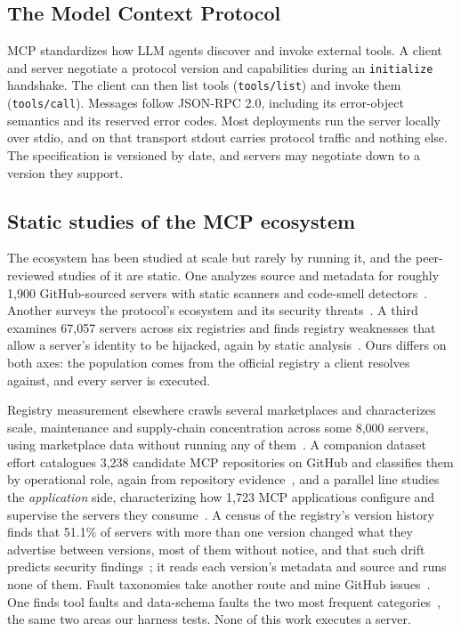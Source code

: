 \subsection{The Model Context Protocol}
MCP standardizes how LLM agents discover and invoke external tools. A client and
server negotiate a protocol version and capabilities during an \texttt{initialize}
handshake. The client can then list tools (\texttt{tools/list}) and invoke them
(\texttt{tools/call}). Messages follow JSON-RPC 2.0, including its error-object
semantics and its reserved error codes. Most deployments run the server locally over
stdio, and on that transport stdout carries protocol traffic and nothing else. The
specification is versioned by date, and servers may negotiate down to a version they
support.

\subsection{Static studies of the MCP ecosystem}
The ecosystem has been studied at scale but rarely by running it, and the
peer-reviewed studies of it are static. One analyzes source and metadata for roughly
1,900 GitHub-sourced servers with static scanners and code-smell
detectors~\cite{mcpfirstglance}. Another surveys the protocol's ecosystem and its
security threats~\cite{mcplandscape}. A third examines 67,057 servers across six
registries and finds registry weaknesses that allow a server's identity to be
hijacked, again by static analysis~\cite{mcpfirstlooksecurity}. Ours differs on both axes: the
population comes from the official registry a client resolves against, and every
server is executed.

Registry measurement elsewhere crawls several marketplaces and characterizes scale,
maintenance and supply-chain concentration across some 8,000 servers, using
marketplace data without running any of them~\cite{mcpcrawler}. A companion dataset
effort catalogues 3,238 candidate MCP
repositories on GitHub and classifies them by operational role, again from repository evidence~\cite{mcpgithubdataset}, and a parallel line studies
the \emph{application} side, characterizing how 1,723 MCP applications configure and
supervise the servers they consume~\cite{mcpapps}. A census of the registry's version
history finds that 51.1\% of servers with more than one version changed what they
advertise between versions, most of them without notice, and that such drift
predicts security findings~\cite{mcpsilentdrift}; it reads each version's metadata and
source and runs none of them. Fault taxonomies take another route and mine GitHub
issues~\cite{runtimefaults,realfaults}. One finds tool faults
and data-schema faults the two most frequent categories~\cite{runtimefaults}, the same two areas our harness tests. None of this
work executes a server.

